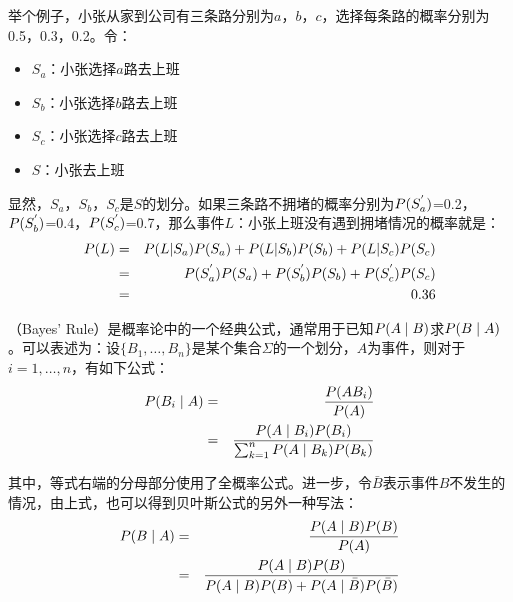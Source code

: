 \parinterval 举个例子，小张从家到公司有三条路分别为$a$，$b$，$c$，选择每条路的概率分别为0.5，0.3，0.2。令：

\begin{itemize}
\vspace{0.5em}
\item $S_a$：小张选择$a$路去上班
\vspace{0.5em}
\item $S_b$：小张选择$b$路去上班
\vspace{0.5em}
\item $S_c$：小张选择$c$路去上班
\vspace{0.5em}
\item $S$：小张去上班
\vspace{0.5em}
\end{itemize}

\parinterval 显然，$S_a$，$S_b$，$S_c$是$S$的划分。如果三条路不拥堵的概率分别为${P}({S_{a}^{'}})$=0.2， ${P}({S_{b}^{'}})$=0.4，${P}({S_{c}^{'}})$=0.7，那么事件$L$：小张上班没有遇到拥堵情况的概率就是：
\begin{eqnarray}
{{P}(L)} &=& {{P}( L| S_a ){P}(S_a )+{P}( L| S_b ){P}(S_b )+{P}( L| S_c ){P}(S_c )}\nonumber \\
& = &{{P}({S_{a}^{'}}){P}(S_a)+{P}({S_{b}^{'}}){P}(S_b)+{P}({S_{c}^{'}}){P}(S_c) }\nonumber \\
& = &{0.36}
\label{eq:2-10}
\end{eqnarray}

（Bayes' Rule）是概率论中的一个经典公式，通常用于已知${P}(A \mid B)$求${P}(B \mid A)$。可以表述为：设$\{B_1, \ldots ,B_n\}$是某个集合$\Sigma$的一个划分，$A$为事件，则对于$i=1, \ldots ,n$，有如下公式：
\begin{eqnarray}
{P}(B_i \mid A) & = & \frac {{P}(A  B_i)} { {P}(A) } \nonumber \\
                                   & = & \frac {{P}(A \mid B_i){P}(B_i) } { \sum_{k=1}^n{P}(A \mid B_k){P}(B_k) }
\label{eq:2-11}
\end{eqnarray}

\noindent 其中，等式右端的分母部分使用了全概率公式。进一步，令$\bar{B}$表示事件$B$不发生的情况，由上式，也可以得到贝叶斯公式的另外一种写法：
\begin{eqnarray}
{P}(B \mid A) & = & \frac { {P}(A \mid B){P}(B) }  {{P}(A)} \nonumber \\
                     & = & \frac { {P}(A \mid B){P}(B) }  {{P}(A \mid B){P}(B)+{P}(A \mid \bar{B}) {P}(\bar{B})}
\label{eq:2-12}
\end{eqnarray}

